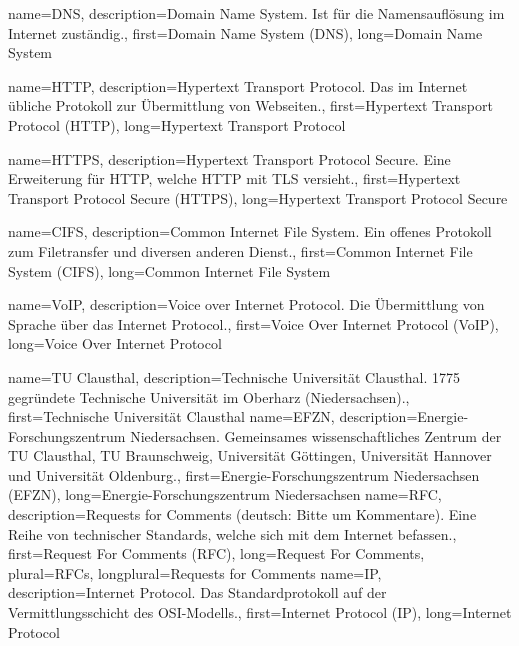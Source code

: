 {%
    name={DNS},
    description={Domain Name System. Ist für die Namensauflösung im
    Internet zuständig.},
    first={Domain Name System (DNS)},
    long={Domain Name System}
}

{%
    name={HTTP},
    description={Hypertext Transport Protocol. Das im Internet übliche
    Protokoll zur Übermittlung von Webseiten.},
    first={Hypertext Transport Protocol (HTTP)},
    long={Hypertext Transport Protocol}

}
{%
    name={HTTPS},
    description={Hypertext Transport Protocol Secure. Eine Erweiterung
    für HTTP, welche HTTP mit TLS versieht.},
    first={Hypertext Transport Protocol Secure (HTTPS)},
    long={Hypertext Transport Protocol Secure}

}
{%
    name={CIFS},
    description={Common Internet File System. Ein offenes
    Protokoll zum Filetransfer und diversen anderen Dienst.},
    first={Common Internet File System (CIFS)},
    long={Common Internet File System}

}
{%
    name={VoIP},
    description={Voice over Internet Protocol. Die Übermittlung von
    Sprache über das Internet Protocol.},
    first={Voice Over Internet Protocol (VoIP)},
    long={Voice Over Internet Protocol}

}
{%
    name={TU Clausthal},
    description={Technische Universität Clausthal. 1775 gegründete
    Technische Universität im Oberharz (Niedersachsen).},
    first={Technische Universität Clausthal}
}
{%
    name={EFZN},
    description={Energie\hyp{}Forschungszentrum Niedersachsen. Gemeinsames
    wissenschaftliches Zentrum der TU Clausthal, TU Braunschweig,
    Universität Göttingen, Universität Hannover und Universität
    Oldenburg.},
    first={Energie-Forschungszentrum Niedersachsen (EFZN)},
    long={Energie-Forschungszentrum Niedersachsen}
}
{%
    name={RFC},
    description={Requests for Comments (deutsch: Bitte um Kommentare).
    Eine Reihe von technischer Standards, welche sich mit dem Internet
    befassen.},
    first={Request For Comments (RFC)},
    long={Request For Comments},
    plural={RFCs},
    longplural={Requests for Comments}
}
{%
    name={IP},
    description={Internet Protocol. Das Standardprotokoll auf der
    Vermittlungsschicht des OSI-Modells.},
    first={Internet Protocol (IP)},
    long={Internet Protocol}
}
